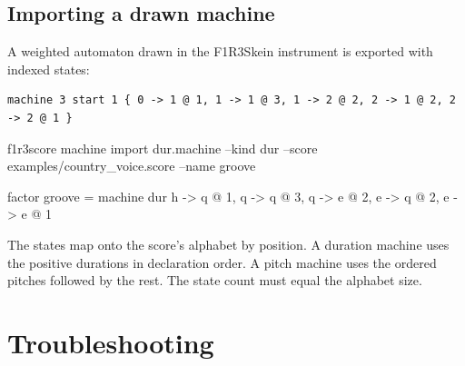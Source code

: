 \documentclass[11pt,a4paper]{article}
\begin{document}
\subsection{Importing a drawn machine}

A weighted automaton drawn in the F1R3Skein instrument is exported with indexed
states:
\begin{lstlisting}[language={}]
machine 3 start 1 { 0 -> 1 @ 1, 1 -> 1 @ 3, 1 -> 2 @ 2, 2 -> 1 @ 2, 2 -> 2 @ 1 }
\end{lstlisting}
\begin{shell}
f1r3score machine import dur.machine --kind dur --score examples/country_voice.score --name groove
\end{shell}
\begin{out}
factor groove = machine dur { h -> q @ 1, q -> q @ 3, q -> e @ 2, e -> q @ 2, e -> e @ 1 }
\end{out}
\noindent The states map onto the score's alphabet by position. A duration
machine uses the positive durations in declaration order. A pitch machine uses
the ordered pitches followed by the rest. The state count must equal the
alphabet size.

\section{Troubleshooting}\label{sec:trouble}
\end{document}
